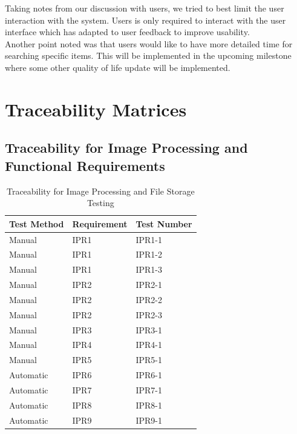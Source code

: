 \documentclass[12pt, titlepage]{article}
\begin{document}
 Taking notes from our discussion with users, we tried to best limit the user interaction with the system. Users is only required to interact with the user interface which has adapted to user feedback to improve usability. \\
 
 Another point noted was that users would like to have more detailed time for searching specific items. This will be implemented in the upcoming milestone where some other quality of life update will be implemented. \\

\section{Traceability Matrices}
\subsection{Traceability for Image Processing and Functional Requirements}
\begin{table}[H]
\begin{tabular}{|p{}|p{}|p{}|}

\hline Test Method&Requirement&Test Number\\

\hline Manual&IPR1&IPR1-1\\

\hline Manual&IPR1&IPR1-2\\

\hline Manual&IPR1&IPR1-3\\

\hline Manual&IPR2&IPR2-1\\

\hline Manual&IPR2&IPR2-2\\

\hline Manual&IPR2&IPR2-3\\

\hline Manual&IPR3&IPR3-1\\

\hline Manual&IPR4&IPR4-1\\

\hline Manual&IPR5&IPR5-1\\

\hline Automatic&IPR6&IPR6-1\\

\hline Automatic&IPR7&IPR7-1\\

\hline Automatic&IPR8&IPR8-1\\

\hline Automatic&IPR9&IPR9-1\\

\hline

\end{tabular}
\caption{Traceability for Image Processing and File Storage Testing}
\end{table}
\end{document}
